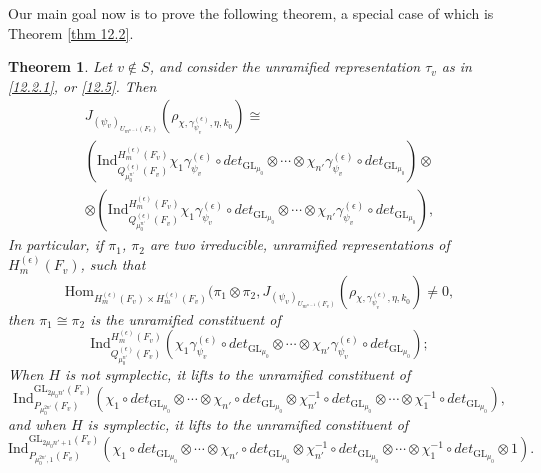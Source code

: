 \documentclass[12pts]{amsart}
\newcommand{\GL}{{\mathrm{GL}}}
\newcommand{\Hom}{{\mathrm{Hom}}}
\newcommand{\Ind}{{\mathrm{Ind}}}
\newtheorem{thm}{Theorem}[section]
\begin{document}
Our main goal now is to prove the following theorem, a special case of which is Theorem \ref{thm 12.2}.
\begin{thm}\label{thm 12.3}
	Let $v\notin S$, and consider the unramified representation $\tau_v$ as in \eqref{12.2.1}, or \eqref{12.5}. Then
	\begin{multline}\label{12.17}
	J_{(\psi_v)_{U_{m^{n-1}}(F_v)}}(\rho_{\chi,\gamma_{\psi_v}^{(\epsilon)},\eta,k_0})\cong\\ (\Ind_{Q_{\mu_0^{n'}}^{(\epsilon)}(F_v)}^{H_m^{(\epsilon)}(F_v)}\chi_1\gamma_{\psi_v}^{(\epsilon)}\circ det_{\GL_{\mu_0}}\otimes\cdots\otimes\chi_{n'}\gamma_{\psi_v}^{(\epsilon)}\circ det_{\GL_{\mu_0}})\otimes\\ \otimes(\Ind_{Q_{\mu_0^{n'}}^{(\epsilon)}(F_v)}^{H_m^{(\epsilon)}(F_v)}\chi_1\gamma_{\psi_v}^{(\epsilon)}\circ det_{\GL_{\mu_0}}\otimes\cdots\otimes\chi_{n'}\gamma_{\psi_v}^{(\epsilon)}\circ det_{\GL_{\mu_0}}),
	\end{multline}
	In particular, if $\pi_1$, $\pi_2$ are two irreducible, unramified representations of $H_m^{(\epsilon)}(F_v)$, such that
	\begin{equation}\label{12.18}
	\Hom_{H_m^{(\epsilon)}(F_v)\times H_m^{(\epsilon)}(F_v)}(\pi_1\otimes \pi_2,
	J_{(\psi_v)_{U_{m^{n-1}}(F_v)}}(\rho_{\chi,\gamma_{\psi_v}^{(\epsilon)},\eta,k_0})\neq 0,
	\end{equation}
	then $\pi_1\cong \pi_2$ is the unramified constituent of 
	$$
	\Ind_{Q_{\mu_0^{n'}}^{(\epsilon)}(F_v)}^{H_m^{(\epsilon)}(F_v)}(\chi_1\gamma_{\psi_v}^{(\epsilon)}\circ det_{\GL_{\mu_0}}\otimes\cdots\otimes\chi_{n'}\gamma_{\psi_v}^{(\epsilon)}\circ det_{\GL_{\mu_0}});
	$$
When $H$ is not symplectic, it lifts to the unramified constituent of
$$
\Ind_{P_{\mu_0^{2n'}}(F_v)}^{\GL_{2\mu_0n'}(F_v)}(\chi_1\circ det_{\GL_{\mu_0}}\otimes\cdots\otimes\chi_{n'}\circ det_{\GL_{\mu_0}}\otimes
\chi^{-1}_{n'}\circ det_{\GL_{\mu_0}}\otimes\cdots\otimes \chi^{-1}_1\circ det_{\GL_{\mu_0}}), 
$$
and when $H$ is symplectic, it lifts to the unramified constituent of
$$
\Ind_{P_{\mu_0^{2n'},1}(F_v)}^{\GL_{2\mu_0n'+1}(F_v)}(\chi_1\circ det_{\GL_{\mu_0}}\otimes\cdots\otimes\chi_{n'}\circ det_{\GL_{\mu_0}}\otimes
\chi^{-1}_{n'}\circ det_{\GL_{\mu_0}}\otimes\cdots\otimes \chi^{-1}_1\circ det_{\GL_{\mu_0}}\otimes 1). 
$$
\end{thm}
\end{document}
